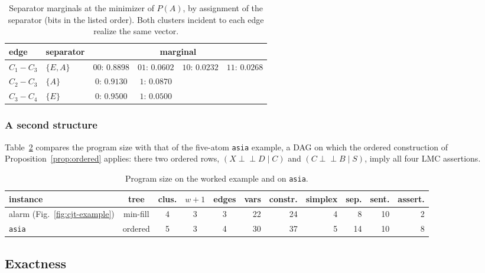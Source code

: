\documentclass{article} %
\newcommand{\indep}{\perp\!\!\!\perp}
\begin{document}
\begin{table}[ht]\centering\small
\caption{Separator marginals at the minimizer of $P(A)$, by assignment of the
separator (bits in the listed order). Both clusters incident to each edge realize
the same vector.}\label{tab:msgs}
\begin{tabular}{@{}llcccc@{}}
\toprule
edge & separator & \multicolumn{4}{c}{marginal}\\
\midrule
$C_1-C_3$ & $\{E,A\}$ & $00{:}\,0.8898$ & $01{:}\,0.0602$ & $10{:}\,0.0232$ & $11{:}\,0.0268$\\
$C_2-C_3$ & $\{A\}$   & $0{:}\,0.9130$  & $1{:}\,0.0870$  & & \\
$C_3-C_4$ & $\{E\}$   & $0{:}\,0.9500$  & $1{:}\,0.0500$  & & \\
\bottomrule
\end{tabular}
\end{table}

\subsubsection{A second structure}

Table~\ref{tab:contrast} compares the program size with that of the five-atom
\texttt{asia} example, a DAG on which the ordered construction of
Proposition~\ref{prop:ordered} applies: there two ordered rows,
$(X\indep D\mid C)$ and $(C\indep B\mid S)$, imply all four LMC assertions.

\begin{table}[ht]\centering\small
\caption{Program size on the worked example and on \texttt{asia}.}\label{tab:contrast}
\begin{tabular}{@{}lccccrrrrrr@{}}
\toprule
instance & tree & clus. & $w{+}1$ & edges & vars & constr. & simplex & sep. & sent. & assert. \\
\midrule
alarm (Fig.~\ref{fig:cjt-example}) & min-fill & 4 & 3 & 3 & 22 & 24 & 4 & 8 & 10 & 2 \\
\texttt{asia} & ordered & 5 & 3 & 4 & 30 & 37 & 5 & 14 & 10 & 8 \\
\bottomrule
\end{tabular}
\end{table}

\subsection{Exactness}\label{sec:theory}
\end{document}
